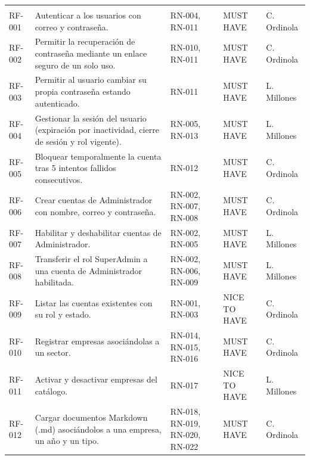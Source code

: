 \begin{longtable}{|C{1.2cm}|L{6.4cm}|L{3.1cm}|C{1.6cm}|C{1.8cm}|}
\hline
{} &  &  &  &  \\
\hline
\endfirsthead
\hline
{} &  &  &  &  \\
\hline
\endhead
RF-001 & Autenticar a los usuarios con correo y contraseña. & RN-004, RN-011 & MUST HAVE & C. Ordinola \\
\hline
RF-002 & Permitir la recuperación de contraseña mediante un enlace seguro de un solo uso. & RN-010, RN-011 & MUST HAVE & C. Ordinola \\
\hline
RF-003 & Permitir al usuario cambiar su propia contraseña estando autenticado. & RN-011 & MUST HAVE & L. Millones \\
\hline
RF-004 & Gestionar la sesión del usuario (expiración por inactividad, cierre de sesión y rol vigente). & RN-005, RN-013 & MUST HAVE & L. Millones \\
\hline
RF-005 & Bloquear temporalmente la cuenta tras 5 intentos fallidos consecutivos. & RN-012 & MUST HAVE & C. Ordinola \\
\hline
RF-006 & Crear cuentas de Administrador con nombre, correo y contraseña. & RN-002, RN-007, RN-008 & MUST HAVE & C. Ordinola \\
\hline
RF-007 & Habilitar y deshabilitar cuentas de Administrador. & RN-002, RN-005 & MUST HAVE & L. Millones \\
\hline
RF-008 & Transferir el rol SuperAdmin a una cuenta de Administrador habilitada. & RN-002, RN-006, RN-009 & MUST HAVE & L. Millones \\
\hline
RF-009 & Listar las cuentas existentes con su rol y estado. & RN-001, RN-003 & NICE TO HAVE & C. Ordinola \\
\hline
RF-010 & Registrar empresas asociándolas a un sector. & RN-014, RN-015, RN-016 & MUST HAVE & C. Ordinola \\
\hline
RF-011 & Activar y desactivar empresas del catálogo. & RN-017 & NICE TO HAVE & L. Millones \\
\hline
RF-012 & Cargar documentos Markdown (.md) asociándolos a una empresa, un año y un tipo. & RN-018, RN-019, RN-020, RN-022 & MUST HAVE & C. Ordinola \\

\end{longtable}
